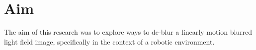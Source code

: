 
\chapter{Aim}

The aim of this research was to explore ways to de-blur a linearly motion blurred light field image, specifically in the context of a robotic environment.